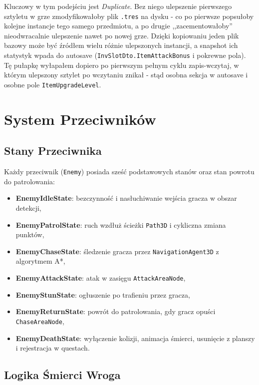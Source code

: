 Kluczowy w tym podejściu jest \emph{Duplicate}. Bez niego ulepszenie pierwszego sztyletu w grze zmodyfikowałoby plik \texttt{.tres} na dysku - co po pierwsze popsułoby kolejne instancje tego samego przedmiotu, a po drugie ,,zacementowałoby'' nieodwracalnie ulepszenie nawet po nowej grze. Dzięki kopiowaniu jeden plik bazowy może być źródłem wielu różnie ulepszonych instancji, a snapshot ich statystyk wpada do autosave (\texttt{InvSlotDto.ItemAttackBonus} i pokrewne pola). Tę pułapkę wyłapałem dopiero po pierwszym pełnym cyklu zapis-wczytaj, w którym ulepszony sztylet po wczytaniu znikał - stąd osobna sekcja w autosave i osobne pole \texttt{ItemUpgradeLevel}.

\section{System Przeciwników}

\subsection{Stany Przeciwnika}

Każdy przeciwnik (\texttt{Enemy}) posiada sześć podstawowych stanów oraz stan powrotu do patrolowania:

\begin{itemize}
    \item \textbf{EnemyIdleState}: bezczynność i nasłuchiwanie wejścia gracza w obszar detekcji,
    \item \textbf{EnemyPatrolState}: ruch wzdłuż ścieżki \texttt{Path3D} i cykliczna zmiana punktów,
    \item \textbf{EnemyChaseState}: śledzenie gracza przez \texttt{NavigationAgent3D} z algorytmem A*,
    \item \textbf{EnemyAttackState}: atak w zasięgu \texttt{AttackAreaNode},
    \item \textbf{EnemyStunState}: ogłuszenie po trafieniu przez gracza,
    \item \textbf{EnemyReturnState}: powrót do patrolowania, gdy gracz opuści \texttt{ChaseAreaNode},
    \item \textbf{EnemyDeathState}: wyłączenie kolizji, animacja śmierci, usunięcie z planszy i rejestracja w questach.
\end{itemize}

\subsection{Logika Śmierci Wroga}

